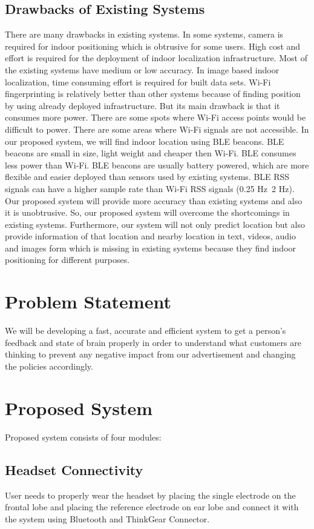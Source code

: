\documentclass[a4paper, 12pt, oneside]{uet_thesis}
\begin{document}
\section{Drawbacks of Existing Systems}
There are many drawbacks in existing systems. In some systems, camera is required for indoor positioning which is obtrusive for some users. High cost and effort is required for the deployment of indoor localization infrastructure. Most of the existing systems have medium or low accuracy. In image based indoor localization, time consuming effort is required for built data sets. Wi-Fi fingerprinting is relatively better than other systems because of finding position by using already deployed infrastructure. But its main drawback is that it consumes more power. There are some spots where Wi-Fi access points would be difficult to power. There are some areas where Wi-Fi signals are not accessible. In our proposed system, we will find indoor location using BLE beacons. BLE beacons are small in size, light weight and cheaper then Wi-Fi. BLE consumes less power than Wi-Fi. BLE beacons are usually battery powered, which are more flexible and easier deployed than sensors used by existing systems. BLE RSS signals can have a higher sample rate than Wi-Fi RSS signals (0.25 Hz~2 Hz). Our proposed system will provide more accuracy than existing systems and also it is unobtrusive. So, our proposed system will overcome the shortcomings in existing systems. Furthermore, our system will not only predict location but also provide information of that location and nearby location in text, videos, audio and images form which is missing in existing systems because they find indoor positioning for different purposes.




\newpage
\chapter{Problem Statement}
We will be developing a fast, accurate and efficient system to get a person’s feedback and state of brain properly in order to understand what customers are thinking to prevent any negative impact from our advertisement and changing the policies accordingly. 

\newpage
\chapter{Proposed System}
Proposed system consists of four modules:

\section{Headset Connectivity}
User needs to properly wear the headset by placing the single electrode on the frontal lobe and placing the reference electrode on ear lobe and connect it with the system using Bluetooth and ThinkGear Connector.
\end{document}
